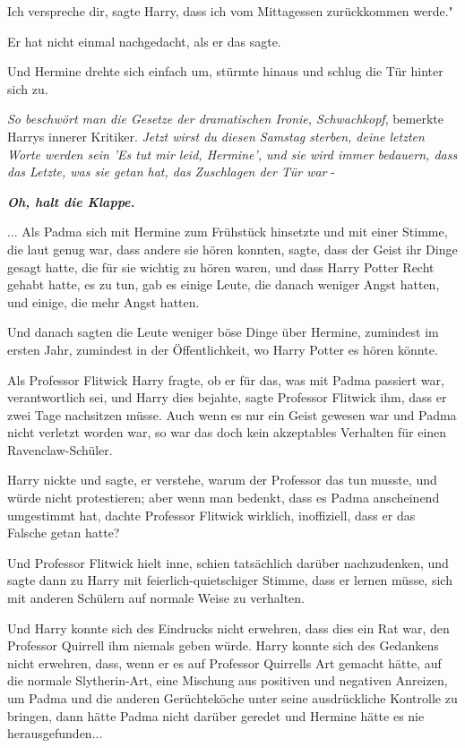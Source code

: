 \glqq{}Ich verspreche dir\grqq{}, sagte Harry, \glqq{}dass ich vom Mittagessen
zurückkommen werde."

Er hat nicht einmal nachgedacht, als er das sagte.

Und Hermine drehte sich einfach um, stürmte hinaus und schlug die Tür hinter
sich zu.

\emph{So beschwört man die Gesetze der dramatischen Ironie, Schwachkopf},
bemerkte Harrys innerer Kritiker. \emph{ Jetzt wirst du diesen Samstag sterben,
deine letzten Worte werden sein 'Es tut mir leid, Hermine', und sie wird immer
bedauern, dass das Letzte, was sie getan hat, das} \emph{Zuschlagen der Tür war}
-

\textbf{\emph{Oh, halt die Klappe.}}

... Als Padma sich mit Hermine zum Frühstück hinsetzte und mit einer Stimme, die
laut genug war, dass andere sie hören konnten, sagte, dass der Geist ihr Dinge
gesagt hatte, die für sie wichtig zu hören waren, und dass Harry Potter Recht
gehabt hatte, es zu tun, gab es einige Leute, die danach weniger Angst hatten,
und einige, die mehr Angst hatten.

Und danach sagten die Leute weniger böse Dinge über Hermine, zumindest im ersten
Jahr, zumindest in der Öffentlichkeit, wo Harry Potter es hören könnte.

Als Professor Flitwick Harry fragte, ob er für das, was mit Padma passiert war,
verantwortlich sei, und Harry dies bejahte, sagte Professor Flitwick ihm, dass
er zwei Tage nachsitzen müsse. Auch wenn es nur ein Geist gewesen war und Padma
nicht verletzt worden war, so war das doch kein akzeptables Verhalten für einen
Ravenclaw-Schüler.

Harry nickte und sagte, er verstehe, warum der Professor das tun musste, und
würde nicht protestieren; aber wenn man bedenkt, dass es Padma anscheinend
umgestimmt hat, dachte Professor Flitwick wirklich, inoffiziell, dass er das
Falsche getan hatte?

Und Professor Flitwick hielt inne, schien tatsächlich darüber nachzudenken, und
sagte dann zu Harry mit feierlich-quietschiger Stimme, dass er lernen müsse,
sich mit anderen Schülern auf normale Weise zu verhalten.

Und Harry konnte sich des Eindrucks nicht erwehren, dass dies ein Rat war, den
Professor Quirrell ihm niemals geben würde. Harry konnte sich des Gedankens
nicht erwehren, dass, wenn er es auf Professor Quirrells Art gemacht hätte, auf
die normale Slytherin-Art, eine Mischung aus positiven und negativen Anreizen,
um Padma und die anderen Gerüchteköche unter seine ausdrückliche Kontrolle zu
bringen, dann hätte Padma nicht darüber geredet und Hermine hätte es nie
herausgefunden...

